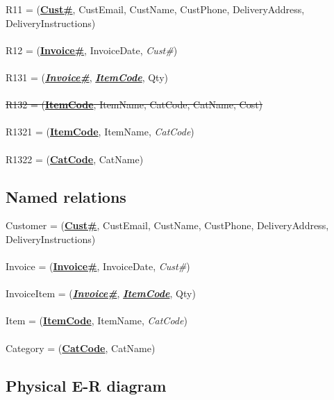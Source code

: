 R11 = (\textbf{\underline{Cust\#}}, CustEmail, CustName, CustPhone, DeliveryAddress, DeliveryInstructions)
\\\\
R12 = (\textbf{\underline{Invoice\#}}, InvoiceDate, \emph{Cust\#})
\\\\
R131 = (\textbf{\underline{\emph{Invoice\#}}}, \textbf{\underline{\emph{ItemCode}}}, Qty)
\\\\
\sout{R132 = (\textbf{\underline{ItemCode}}, ItemName, CatCode, CatName, Cost)}
\\\\
R1321 = (\textbf{\underline{ItemCode}}, ItemName, \emph{CatCode})
\\\\
R1322 = (\textbf{\underline{CatCode}}, CatName)

\subsection{Named relations}

Customer = (\textbf{\underline{Cust\#}}, CustEmail, CustName, CustPhone, DeliveryAddress, DeliveryInstructions)
\\\\
Invoice = (\textbf{\underline{Invoice\#}}, InvoiceDate, \emph{Cust\#})
\\\\
InvoiceItem = (\textbf{\underline{\emph{Invoice\#}}}, \textbf{\underline{\emph{ItemCode}}}, Qty)
\\\\
Item = (\textbf{\underline{ItemCode}}, ItemName, \emph{CatCode})
\\\\
Category = (\textbf{\underline{CatCode}}, CatName)

\subsection{Physical E-R diagram}